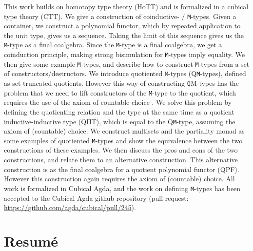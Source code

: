 \documentclass[twoside,11pt,openright]{report}
\theoremstyle{plain} %
\theoremstyle{definition}
\theoremstyle{remark}
\begin{document}
This work builds on homotopy type theory (HoTT) and is formalized in a cubical type theory (CTT). We give a construction of coinductive- / \texttt{M}-types. Given a container, we construct a polynomial functor, which by repeated application to the unit type, gives us a sequence. Taking the limit of this sequence gives us the \texttt{M}-type as a final coalgebra. Since the \texttt{M}-type is a final coalgebra, we get a coinduction principle, making strong bisimulation for \texttt{M}-types imply equality. We then give some example \texttt{M}-types, and describe how to construct \texttt{M}-types from a set of constructors/destructors. We introduce quotiented \texttt{M}-types (Q\texttt{M}-types), defined as set truncated quotients. However this way of constructing \texttt{Q}M-types has the problem that we need to lift constructors of the \texttt{M}-type to the quotient, which requires the use of the axiom of countable choice \cite{DBLP:tt-in-tt}. We solve this problem by defining the quotienting relation and the type at the same time as a quotient inductive-inductive type (QIIT), which is equal to the Q\texttt{M}-type, assuming the axiom of (countable) choice. We construct multisets and the partiality monad as some examples of quotiented \texttt{M}-types and show the equivalence between the two constructions of these examples. We then discuss the pros and cons of the two constructions, and relate them to an alternative construction. This alternative construction is as the final coalgebra for a quotient polynomial functor (QPF). However this construction again requires the axiom of (countable) choice. All work is formalized in Cubical Agda, and the work on defining \texttt{M}-types has been accepted to the Cubical Agda github repository (pull request: \url{https://github.com/agda/cubical/pull/245}).

\chapter*{Resum\'e}
\end{document}
